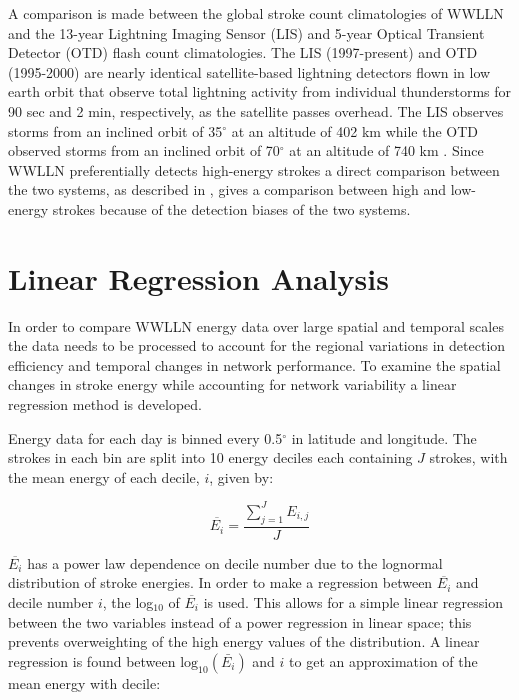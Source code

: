A comparison is made between the global stroke count climatologies of WWLLN and the 13-year Lightning Imaging Sensor (LIS) and 5-year Optical Transient Detector (OTD) flash count climatologies. 
The LIS (1997-present) and OTD (1995-2000) are nearly identical satellite-based lightning detectors flown in low earth orbit that observe total lightning activity from individual thunderstorms for 90 sec and 2 min, respectively, as the satellite passes overhead.
The LIS observes storms from an inclined orbit of 35$^\circ$ at an altitude of 402 km while the OTD observed storms from an inclined orbit of 70$^\circ$ at an altitude of 740 km \citep{Christian1999, Christian2003}.
Since WWLLN preferentially detects high-energy strokes \citep{Hutchins2012a} a direct comparison between the two systems, as described in \citet{Virts2013}, gives a comparison between high and low-energy strokes because of the detection biases of the two systems.

\section{Linear Regression Analysis}
\label{landsea:section:secLinReg}

In order to compare WWLLN energy data over large spatial and temporal scales the data needs to be processed to account for the regional variations in detection efficiency and temporal changes in network performance.
To examine the spatial changes in stroke energy while accounting for network variability a linear regression method is developed.

Energy data for each day is binned every 0.5$^\circ$ in latitude and longitude.
The strokes in each bin are split into 10 energy deciles each containing $J$ strokes, with the mean energy of each decile, $i$, given by:

\begin{equation}
\overline{E_i} = \frac{\sum_{j=1}^J E_{i,j}}{J} 
\end{equation}

$\overline{E_i}$ has a power law dependence on decile number due to the lognormal distribution of stroke energies.
In order to make a regression between $\overline{E_i}$ and decile number $i$, the log$_{10}$ of $\overline{E_i}$ is used.
This allows for a simple linear regression between the two variables instead of a power regression in linear space; this prevents overweighting of the high energy values of the distribution. 
A linear regression is found between $\text{log}_{10}(\bar{E_i})$ and $i$ to get an approximation of the mean energy with decile:

